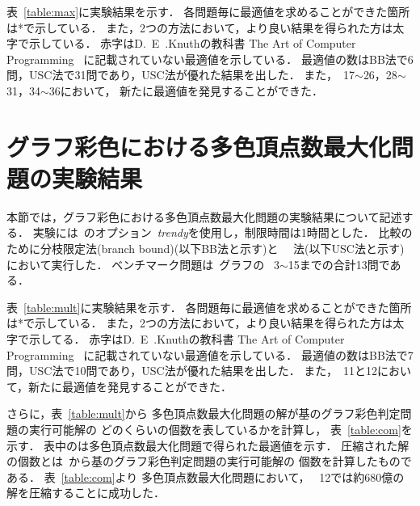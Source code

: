 表~\ref{table:max}に実験結果を示す．
各問題毎に最適値を求めることができた箇所は*で示している．
また，2つの方法において，より良い結果を得られた方は太字で示している．
赤字はD.~E~.Knuthの教科書
The Art of Computer Programming~\cite{Knuth:TAOCP:SAT}
に記載されていない最適値を示している．
最適値の数はBB法で6問，USC法で31問であり，USC法が優れた結果を出した．
また，~17$\sim$26，28$\sim$31，34$\sim$36において，
新たに最適値を発見することができた．

\section{グラフ彩色における多色頂点数最大化問題の実験結果}

本節では，グラフ彩色における多色頂点数最大化問題の実験結果について記述する．
実験には~{\clingo}のオプション~\textit{trendy}を使用し，制限時間は1時間とした．
比較のために分枝限定法(branch bound)(以下BB法と示す)と
~~法(以下USC法と示す)において実行した．
ベンチマーク問題は~グラフの
~3$\sim$15までの合計13問である．

表~\ref{table:mult}に実験結果を示す．
各問題毎に最適値を求めることができた箇所は*で示している．
また，2つの方法において，より良い結果を得られた方は太字で示してる．
赤字はD.~E~.Knuthの教科書
The Art of Computer Programming~\cite{Knuth:TAOCP:SAT}
に記載されていない最適値を示している．
最適値の数はBB法で7問，USC法で10問であり，USC法が優れた結果を出した．
また，~11と12において，新たに最適値を発見することができた．

さらに，表~\ref{table:mult}から
多色頂点数最大化問題の解が基のグラフ彩色判定問題の実行可能解の
どのくらいの個数を表しているかを計算し，
表~\ref{table:com}を示す．
表中のは多色頂点数最大化問題で得られた最適値を示す．
圧縮された解の個数とは~から基のグラフ彩色判定問題の実行可能解の
個数を計算したものである．
表~\ref{table:com}より
多色頂点数最大化問題において，
~12では約680億の解を圧縮することに成功した．



